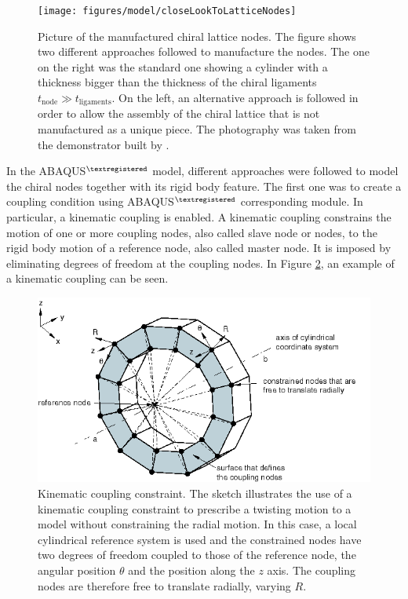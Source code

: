     \begin{figure}[!htpb]
      \centering
      \texttt{[image: figures/model/closeLookToLatticeNodes]}
      \caption[Picture of the manufactured chiral lattice nodes]{Picture of the manufactured chiral lattice nodes. The figure shows two different approaches followed to manufacture the nodes. The one on the right was the standard one showing a cylinder with a thickness bigger than the thickness of the chiral ligaments $t_{\mathrm{node}} \gg t_{\mathrm{ligaments}}$. On the left, an alternative approach is followed in order to allow the assembly of the chiral lattice that is not manufactured as a unique piece. The photography was taken from the demonstrator built by \cite{Vincenz2017}.}\label{fig:closeLookToLatticeNodes}
    \end{figure}

    In the ABAQUS$^{\textregistered}$ model, different approaches were followed to model the chiral nodes together with its rigid body feature. The first one was to create a coupling condition using ABAQUS$^{\textregistered}$ corresponding module. In particular, a kinematic coupling is enabled. A kinematic coupling constrains the motion of one or more coupling nodes, also called slave node or nodes, to the rigid body motion of a reference node, also called master node. It is imposed by eliminating degrees of freedom at the coupling nodes. In Figure \ref{fig:kinematicCoupling}, an example of a kinematic coupling can be seen.

    \begin{figure}[!htpb]
      \centering
      \includegraphics[width=0.8 \textwidth]{figures/model/pcoupling-kinematic}
      \caption[Kinematic coupling constraint]{Kinematic coupling constraint. The sketch illustrates the use of a kinematic coupling constraint to prescribe a twisting motion to a model without constraining the radial motion. In this case, a local cylindrical reference system is used and the constrained nodes have two degrees of freedom coupled to those of the reference node, the angular position $\theta$ and the position along the $z$ axis. The coupling nodes are therefore free to translate radially, varying $R$. \cite{Abaqus}}\label{fig:kinematicCoupling}
    \end{figure}

